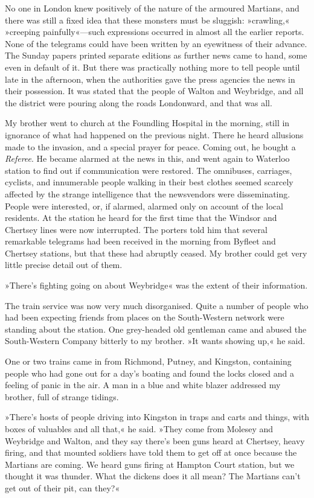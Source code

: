 No one in London knew positively of the nature of the armoured Martians, and there was still a fixed idea that these monsters must be sluggish: »crawling,« »creeping painfully«—such expressions occurred in almost all the earlier reports. None of the telegrams could have been written by an eyewitness of their advance. The Sunday papers printed separate editions as further news came to hand, some even in default of it. But there was practically nothing more to tell people until late in the afternoon, when the authorities gave the press agencies the news in their possession. It was stated that the people of Walton and Weybridge, and all the district were pouring along the roads Londonward, and that was all.

My brother went to church at the Foundling Hospital in the morning, still in ignorance of what had happened on the previous night. There he heard allusions made to the invasion, and a special prayer for peace. Coming out, he bought a \textit{Referee}. He became alarmed at the news in this, and went again to Waterloo station to find out if communication were restored. The omnibuses, carriages, cyclists, and innumerable people walking in their best clothes seemed scarcely affected by the strange intelligence that the newsvendors were disseminating. People were interested, or, if alarmed, alarmed only on account of the local residents. At the station he heard for the first time that the Windsor and Chertsey lines were now interrupted. The porters told him that several remarkable telegrams had been received in the morning from Byfleet and Chertsey stations, but that these had abruptly ceased. My brother could get very little precise detail out of them.

»There's fighting going on about Weybridge« was the extent of their information.

The train service was now very much disorganised. Quite a number of people who had been expecting friends from places on the South-Western network were standing about the station. One grey-headed old gentleman came and abused the South-Western Company bitterly to my brother. »It wants showing up,« he said.

One or two trains came in from Richmond, Putney, and Kingston, containing people who had gone out for a day's boating and found the locks closed and a feeling of panic in the air. A man in a blue and white blazer addressed my brother, full of strange tidings.

»There's hosts of people driving into Kingston in traps and carts and things, with boxes of valuables and all that,« he said. »They come from Molesey and Weybridge and Walton, and they say there's been guns heard at Chertsey, heavy firing, and that mounted soldiers have told them to get off at once because the Martians are coming. We heard guns firing at Hampton Court station, but we thought it was thunder. What the dickens does it all mean? The Martians can't get out of their pit, can they?«

